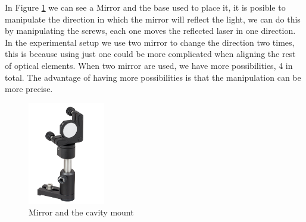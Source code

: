 In Figure \ref{fig:mirror} we can see a Mirror and the base used to place it, it is posible
to manipulate the direction in which the mirror will reflect the light,  we can do this 
by manipulating the screws, each one moves the reflected laser in one direction. 
In the experimental setup we use two mirror to change the direction two times, this is because 
using just one could be more complicated when aligning the rest of optical elements. 
When two mirror are used, we have more possibilities, 4 in total. The advantage 
of having more possibilities is that the manipulation can be more precise.
\begin{figure}[h!]
\centering

 \includegraphics[width=0.3\textwidth]{Figures/mirror.jpg}
\caption{Mirror and the cavity mount} 
\label{fig:mirror}
\end{figure}

